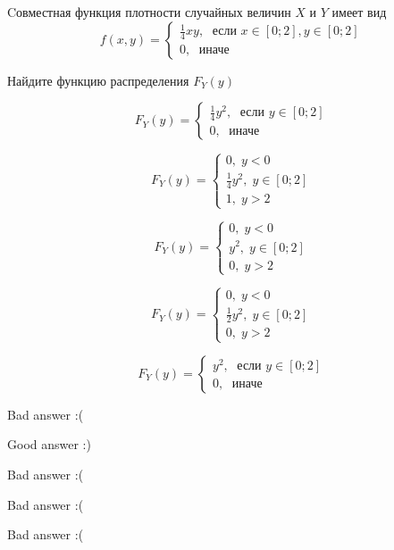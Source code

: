 
\begin{question}
Cовместная функция плотности случайных величин \(X\) и \(Y\) имеет вид
\[
f(x,y)=\begin{cases}
\frac{1}{4}xy, \; \text{ если } x\in[0;2], y\in [0;2] \\
0, \; \text{ иначе}
\end{cases}
\]

Найдите функцию распределения \(F_Y(y)\)
\begin{answerlist}
  \item \[F_Y(y)=\begin{cases} \frac{1}{4}y^2, \; \text{ если } y\in [0;2] \\ 0, \; \text{ иначе} \end{cases}\]
  \item \[F_Y(y)=\begin{cases} 0, \;  y < 0 \\ \frac{1}{4}y^2, \; y\in [0;2] \\ 1, \; y > 2 \end{cases}\]
  \item \[F_Y(y)=\begin{cases} 0, \;  y < 0 \\ y^2, \; y\in [0;2] \\ 0, \; y > 2 \end{cases}\]
  \item \[F_Y(y)=\begin{cases} 0, \;  y < 0 \\ \frac{1}{2}y^2, \; y\in [0;2] \\ 0, \; y > 2 \end{cases}\]
  \item \[F_Y(y)=\begin{cases} y^2, \; \text{ если } y\in [0;2] \\ 0, \; \text{ иначе} \end{cases}\]
\end{answerlist}
\end{question}

\begin{solution}
\begin{answerlist}
  \item Bad answer :(
  \item Good answer :)
  \item Bad answer :(
  \item Bad answer :(
  \item Bad answer :(
\end{answerlist}
\end{solution}

